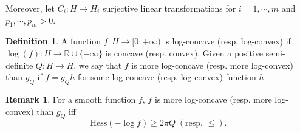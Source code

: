\documentclass[11pt,a4paper,reqno]{amsart}
\numberwithin{equation}{section}
\theoremstyle{definition}
\newtheorem{definition}[theorem]{Definition}
\newtheorem{remark}[theorem]{Remark}
\newcommand{\<}{\ensuremath \leq}
\renewcommand{\>}{\ensuremath \geq}
\begin{document}
Moreover, let $C_i: H \rightarrow H_i$ surjective linear transformations for $i=1,\cdots,m$ and $p_1,\cdots,p_m>0.$ 



 

\begin{definition}
A function $f: H \rightarrow [0;+\infty)$ is log-concave (resp. log-convex) if $\log(f): H \rightarrow \mathbb{R} \cup \{-\infty\}$ is concave (resp. convex). Given a positive semi-definite $Q: H \rightarrow H$, we say that $f$ is more log-concave (resp. more log-convex) than $g_Q$ if $f=g_Qh$ for some log-concave (resp. log-convex) function $h.$ 
\end{definition}


\begin{remark}
For a smooth function $f$, $f$ is more log-concave (resp. more log-convex) than $g_Q$ iff $$\mathrm{Hess}(-\log f) \geq 2\pi Q \; (\text{resp. } \leq).$$
\end{remark}

\hfill \\
\end{document}
